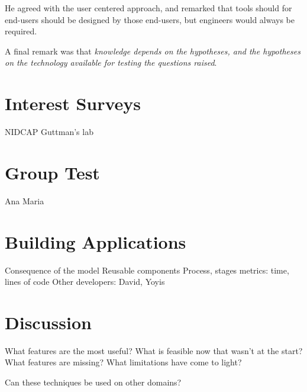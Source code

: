 He agreed with the user centered approach, and remarked that tools should for end-users should be designed by those end-users, but engineers would always be required.

A final remark was that \emph{knowledge depends on the hypotheses, and the hypotheses on the technology available for testing the questions raised}. 






\section{Interest Surveys}
NIDCAP
Guttman's lab

\section{Group Test}

Ana Maria

\section{Building Applications}

Consequence of the model
Reusable components
Process, stages
metrics: time, lines of code
Other developers: David, Yoyis


\section{Discussion}

What features are the most useful?
What is feasible now that wasn't at the start?
What features are missing?
What limitations have come to light?

Can these techniques be used on other domains?



